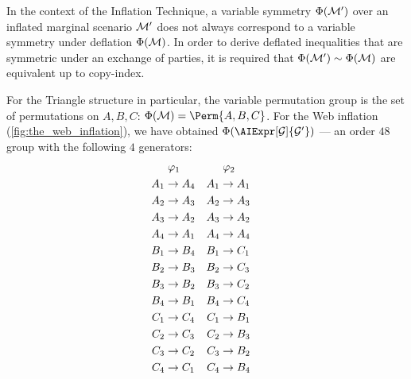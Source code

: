 \documentclass[aps, 10pt, english, twoside, pra, nofootinbib, tightenlines, longbibliography, superscriptaddress]{revtex4-1}
\begin{document}
    In the context of the Inflation Technique, a variable symmetry $\Phi\br{\mscenario'}$ over an inflated marginal scenario $\mathcal{M}'$ does not always correspond to a variable symmetry under deflation $\Phi\br{\mscenario}$. In order to derive deflated inequalities that are symmetric under an exchange of parties, it is required that $\Phi\br{\mscenario'} \sim \Phi\br{\mscenario}$ are equivalent up to copy-index.

    For the Triangle structure in particular, the variable permutation group is the set of permutations on $A, B, C$: $\Phi\br{\mscenario} = \Perm{A, B, C}$. For the Web inflation (\cref{fig:the_web_inflation}), we have obtained $\gp\br{\AIExpr[\graph]{\graph'}}$ --- an order $48$ group with the following $4$ generators:
    \begin{equation}
    \begin{aligned}[c]
    &\hspace{1mm}\varphi_1 \\
    A_1 &\to A_4 \\A_2 &\to A_3 \\A_3 &\to A_2 \\A_4 &\to A_1 \\B_1 &\to B_4 \\B_2 &\to B_3 \\B_3 &\to B_2 \\B_4 &\to B_1 \\C_1 &\to C_4 \\C_2 &\to C_3 \\C_3 &\to C_2 \\C_4 &\to C_1
    \end{aligned}
    \quad
    \begin{aligned}[c]
    &\hspace{1mm}\varphi_2 \\
    A_1 &\to A_1 \\A_2 &\to A_3 \\A_3 &\to A_2 \\A_4 &\to A_4 \\B_1 &\to C_1 \\B_2 &\to C_3 \\B_3 &\to C_2 \\B_4 &\to C_4 \\C_1 &\to B_1 \\C_2 &\to B_3 \\C_3 &\to B_2 \\C_4 &\to B_4
    \end{aligned}
    \quad
    \begin{aligned}[c]

\end{aligned}
\end{equation}
\end{document}
